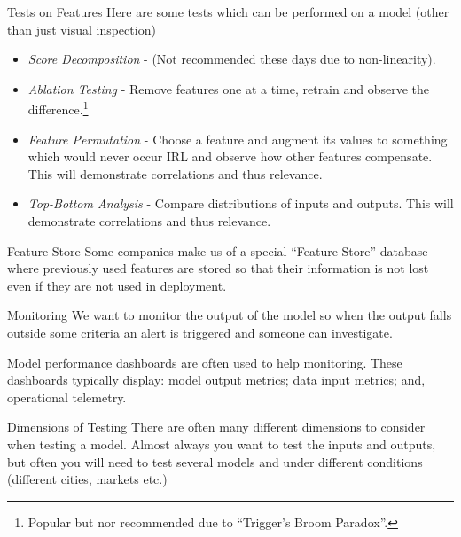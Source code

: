 \documentclass[11pt,a4paper]{article}
\begin{document}
  \begin{proposition}{Tests on Features}
    Here are some tests which can be performed on a model (other than just visual inspection)
    \begin{itemize}
      \item \textit{Score Decomposition} - (Not recommended these days due to non-linearity).
      \item \textit{Ablation Testing} - Remove features one at a time, retrain and observe the difference.\footnote{Popular but nor recommended due to ``Trigger's Broom Paradox''.}
      \item \textit{Feature Permutation} - Choose a feature and augment its values to something which would never occur IRL and observe how other features compensate. This will demonstrate correlations and thus relevance.
      \item \textit{Top-Bottom Analysis} - Compare distributions of inputs and outputs. This will demonstrate correlations and thus relevance.
    \end{itemize}
  \end{proposition}

  \begin{remark}{Feature Store}
    Some companies make us of a special ``Feature Store'' database where previously used features are stored so that their information is not lost even if they are not used in deployment.
  \end{remark}

  \begin{proposition}{Monitoring}
    We want to monitor the output of the model so when the output falls outside some criteria an alert is triggered and someone can investigate.
    \par Model performance dashboards are often used to help monitoring. These dashboards typically display: model output metrics; data input metrics; and, operational telemetry.
  \end{proposition}

  \begin{proposition}{Dimensions of Testing}
    There are often many different dimensions to consider when testing a model. Almost always you want to test the inputs and outputs, but often you will need to test several models and under different conditions (different cities, markets etc.)
  \end{proposition}
\end{document}

